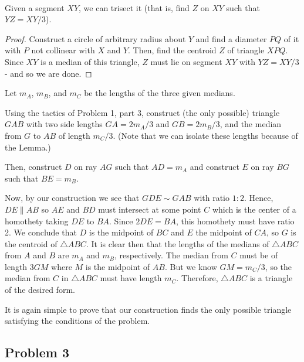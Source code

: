 \begin{mdsoln} \ \\
    \begin{lemma}
        Given a segment $XY$, we can trisect it (that is, find $Z$ on $XY$ such that $YZ = XY/3$).
    \end{lemma}
    \begin{proof}
        Construct a circle of arbitrary radius about $Y$ and find a diameter $PQ$ of it with $P$ not collinear with $X$ and $Y$. Then, find the centroid $Z$ of triangle $XPQ$. Since $XY$ is a median of this triangle, $Z$ must lie on segment $XY$ with $YZ = XY/3$ - and so we are done.
    \end{proof}
 
\vspace{6pt}
Let $m_A$, $m_B$, and $m_C$ be the lengths of the three given medians.

Using the tactics of Problem 1, part 3, construct (the only possible) triangle $GAB$ with two side lengths $GA = 2m_A/3$ and $GB = 2m_B/3$, and the median from $G$ to $AB$ of length $m_C/3$. (Note that we can isolate these lengths because of the Lemma.)

Then, construct $D$ on ray $AG$ such that $AD = m_A$ and construct $E$ on ray $BG$ such that $BE = m_B$.

Now, by our construction we see that $GDE\sim GAB$ with ratio $1: 2$. Hence, $DE\parallel AB$ so $AE$ and $BD$ must intersect at some point $C$ which is the center of a homothety taking $DE$ to $BA$. Since $2DE = BA$, this homothety must have ratio 2. We conclude that $D$ is the midpoint of $BC$ and $E$ the midpoint of $CA$, so $G$ is the centroid of $\triangle ABC$. It is clear then that the lengths of the medians of $\triangle ABC$ from $A$ and $B$ are $m_A$ and $m_B$, respectively. The median from $C$ must be of length $3GM$ where $M$ is the midpoint of $AB$. But we know $GM = m_C/3$, so the median from $C$ in $\triangle ABC$ must have length $m_C$. Therefore, $\triangle ABC$ is a triangle of the desired form.

It is again simple to prove that our construction finds the only possible triangle satisfying the conditions of the problem.

\end{mdsoln}

\subsection{Problem 3}

